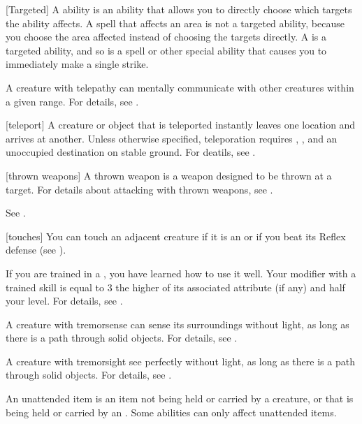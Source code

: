 [Targeted] A  ability is an ability that allows you to directly choose which targets the ability affects.
A spell that affects an area is not a targeted ability, because you choose the area affected instead of choosing the targets directly.
A  is a targeted ability, and so is a spell or other special ability that causes you to immediately make a single strike.

 A creature with telepathy can mentally communicate with other creatures within a given range.
For details, see .

[teleport] A creature or object that is teleported instantly leaves one location and arrives at another.
Unless otherwise specified, teleporation requires , , and an unoccupied destination on stable ground.
For deatils, see .

[thrown weapons] A thrown weapon is a weapon designed to be thrown at a target.
For details about attacking with thrown weapons, see .

 See .

[touches] You can touch an adjacent creature if it is an  or if you beat its Reflex defense (see ).


 If you are trained in a , you have learned how to use it well.
Your modifier with a trained skill is equal to 3 \add the higher of its associated attribute (if any) and half your level.
For details, see .

 A creature with tremorsense can sense its surroundings without light, as long as there is a path through solid objects.
For details, see .

 A creature with tremorsight see perfectly without light, as long as there is a path through solid objects.
For details, see .

 An unattended item is an item not being held or carried by a creature, or that is being held or carried by an .
Some abilities can only affect unattended items.

